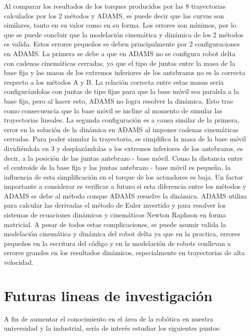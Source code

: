             Al comparar los resultados de los torques producidos por las 8 trayectorias calculados por los 2 métodos y ADAMS, se puede decir que las curvas son similares, tanto en su valor como en su forma. Los errores son mínimos, por lo que se puede concluir que la modelación cinemática y dinámica de los 2 métodos es valida. Estos errores pequeños se deben principalmente por 2 configuraciones en ADAMS. La primera se debe a que en ADAMS no se configura robot delta con cadenas cinemáticas cerradas, ya que el tipo de juntas entre la masa de la base fija y las masas de los extremos inferiores de los antebrazos no es la correcta respecto a los métodos A y B. La relación correcta entre estas masas seria configurándolas con juntas de tipo fijas para que la base móvil sea paralela a la base fija, pero al hacer esto,  ADAMS no logra resolver la dinámica. Esto trae como consecuencia que la base móvil se incline al momento de simular las trayectorias lineales. La segunda configuración es a causa similar de la primera, error en la solución de la dinámica en ADAMS al imponer cadenas cinemáticas cerradas. Para poder simular la trayectoria, se simplifica la masa de la base móvil dividiéndola en 3 y desplazándolas a los extremos inferiores de los antebrazos, es decir, a la posición de las juntas antebrazo - base móvil. Como la distancia entre el centroide de la base fija y las juntas antebrazo - base móvil es pequeña, la influencia de esta simplificación en el torque de los actuadores es baja. Un factor importante a considerar es verificar a futuro si esta diferencia entre los métodos y ADAMS se debe al método conque ADAMS resuelve la dinámica. ADAMS utiliza para calcular las derivadas el método de Euler invertido y para resolver los sistemas de ecuaciones dinámicos y cinemáticos Newton Raphson en forma matricial. A pesar de todos estas complicaciones, se puede asumir valida la modelación cinemática y dinámica del robot delta ya que en la practica, errores pequeños en la escritura del código y en la modelación de robots conllevan a errores grandes en los resultados dinámicos, especialmente en trayectorias de alta velocidad. 


\newpage

\section{Futuras lineas de investigación}
A fin de aumentar el conocimiento en el área de la robótica en nuestra universidad y la industrial, sería de interés estudiar los siguientes puntos:

